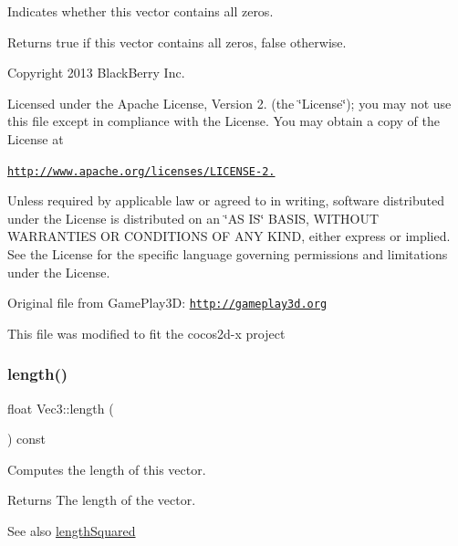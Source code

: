 Indicates whether this vector contains all zeros.

\begin{DoxyReturn}{Returns}
true if this vector contains all zeros, false otherwise.
\end{DoxyReturn}
Copyright 2013 Black\+Berry Inc.

Licensed under the Apache License, Version 2. (the \char`\"{}\+License\char`\"{}); you may not use this file except in compliance with the License. You may obtain a copy of the License at

\href{http://www.apache.org/licenses/LICENSE-2.0}{\tt http\+://www.\+apache.\+org/licenses/\+L\+I\+C\+E\+N\+S\+E-\/2.}

Unless required by applicable law or agreed to in writing, software distributed under the License is distributed on an \char`\"{}\+A\+S I\+S\char`\"{} B\+A\+S\+IS, W\+I\+T\+H\+O\+UT W\+A\+R\+R\+A\+N\+T\+I\+ES OR C\+O\+N\+D\+I\+T\+I\+O\+NS OF A\+NY K\+I\+ND, either express or implied. See the License for the specific language governing permissions and limitations under the License.

Original file from Game\+Play3D\+: \href{http://gameplay3d.org}{\tt http\+://gameplay3d.\+org}

This file was modified to fit the cocos2d-\/x project \mbox{\label{classVec3_a54be9143adb871a478ea3de19ca23f3b}} 
\subsubsection{\texorpdfstring{length()}{length()}\hspace{0.1cm}{\footnotesize\ttfamily [1/2]}}
{\footnotesize\ttfamily float Vec3\+::length (\begin{DoxyParamCaption}{ }\end{DoxyParamCaption}) const\hspace{0.3cm}{\ttfamily [inline]}}

Computes the length of this vector.

\begin{DoxyReturn}{Returns}
The length of the vector.
\end{DoxyReturn}
\begin{DoxySeeAlso}{See also}
\hyperlink{classVec3_a31d057d72313ad255d61fb684a37c24f}{length\+Squared} 
\end{DoxySeeAlso}
\mbox{\label{classVec3_a54be9143adb871a478ea3de19ca23f3b}} 
